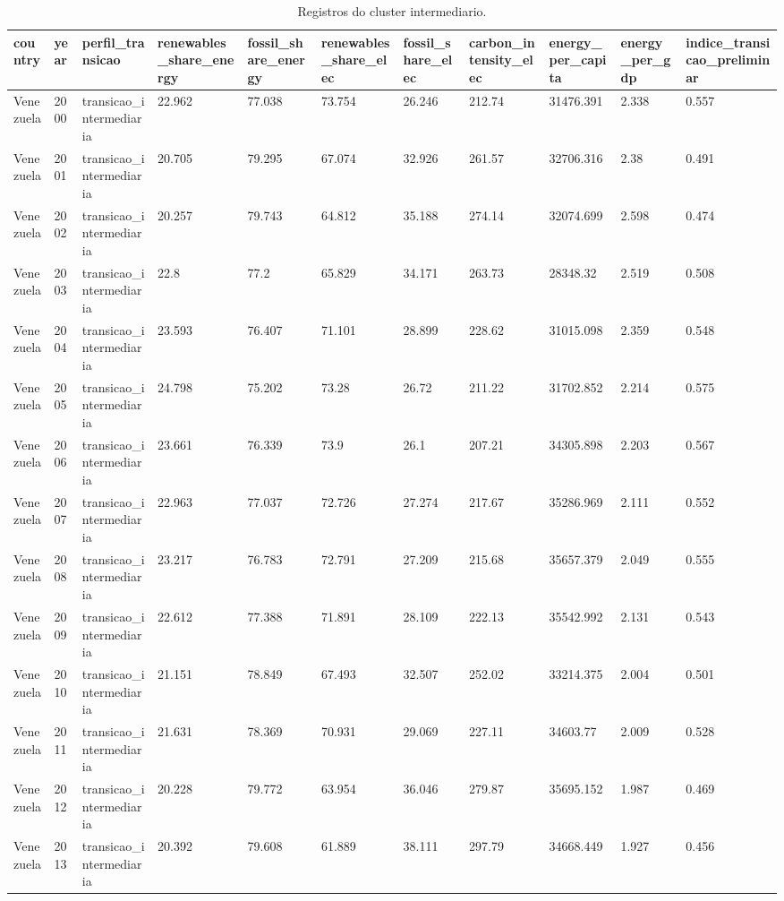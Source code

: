 \begin{table}[htbp]
\centering
\caption{Registros do cluster intermediario.}
\label{tab:cluster-intermediario-detalhado}
\begin{tabular}{lllllllllll}
\hline
country & year & perfil\_transicao & renewables\_share\_energy & fossil\_share\_energy & renewables\_share\_elec & fossil\_share\_elec & carbon\_intensity\_elec & energy\_per\_capita & energy\_per\_gdp & indice\_transicao\_preliminar \\
\hline
Venezuela & 2000 & transicao\_intermediaria & 22.962 & 77.038 & 73.754 & 26.246 & 212.74 & 31476.391 & 2.338 & 0.557 \\
Venezuela & 2001 & transicao\_intermediaria & 20.705 & 79.295 & 67.074 & 32.926 & 261.57 & 32706.316 & 2.38 & 0.491 \\
Venezuela & 2002 & transicao\_intermediaria & 20.257 & 79.743 & 64.812 & 35.188 & 274.14 & 32074.699 & 2.598 & 0.474 \\
Venezuela & 2003 & transicao\_intermediaria & 22.8 & 77.2 & 65.829 & 34.171 & 263.73 & 28348.32 & 2.519 & 0.508 \\
Venezuela & 2004 & transicao\_intermediaria & 23.593 & 76.407 & 71.101 & 28.899 & 228.62 & 31015.098 & 2.359 & 0.548 \\
Venezuela & 2005 & transicao\_intermediaria & 24.798 & 75.202 & 73.28 & 26.72 & 211.22 & 31702.852 & 2.214 & 0.575 \\
Venezuela & 2006 & transicao\_intermediaria & 23.661 & 76.339 & 73.9 & 26.1 & 207.21 & 34305.898 & 2.203 & 0.567 \\
Venezuela & 2007 & transicao\_intermediaria & 22.963 & 77.037 & 72.726 & 27.274 & 217.67 & 35286.969 & 2.111 & 0.552 \\
Venezuela & 2008 & transicao\_intermediaria & 23.217 & 76.783 & 72.791 & 27.209 & 215.68 & 35657.379 & 2.049 & 0.555 \\
Venezuela & 2009 & transicao\_intermediaria & 22.612 & 77.388 & 71.891 & 28.109 & 222.13 & 35542.992 & 2.131 & 0.543 \\
Venezuela & 2010 & transicao\_intermediaria & 21.151 & 78.849 & 67.493 & 32.507 & 252.02 & 33214.375 & 2.004 & 0.501 \\
Venezuela & 2011 & transicao\_intermediaria & 21.631 & 78.369 & 70.931 & 29.069 & 227.11 & 34603.77 & 2.009 & 0.528 \\
Venezuela & 2012 & transicao\_intermediaria & 20.228 & 79.772 & 63.954 & 36.046 & 279.87 & 35695.152 & 1.987 & 0.469 \\
Venezuela & 2013 & transicao\_intermediaria & 20.392 & 79.608 & 61.889 & 38.111 & 297.79 & 34668.449 & 1.927 & 0.456 \\

\end{tabular}
\end{table}
